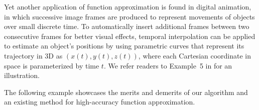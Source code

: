 \documentclass[review]{elsarticle}
\newcommand{\abstol}{\varepsilon}
\theoremstyle{definition}
\newcommand{\cosappx}{\widehat{\operatorname*{cos}}}
\newcommand{\sinappx}{\widehat{\operatorname*{sin}}}
\begin{document}
\begin{comment}
Denote $\sinappx(x)$ and $\cosappx (x)$ the approximate functions of $\sin(x)$ and
$\cos(x)$ on the interval $[0,4\pi]$, respectively; and let the resultant
approximants of $x(u,v)$, $y(u,v)$, and $z(u,v)$ be $\hat{x}(u,v)$,
$\hat{y}(u,v)$, and $\hat{z}(u,v)$, respectively.
Then we have
\begin{align*}
   \hat{x}(u,v) & =  \left[a\left(1-\frac{v}{2\pi}\right)\left(1+\cosappx(u)\right) + c\right]\cosappx(nv),
\\ \hat{y}(u,v) & = \left[a\left(1-\frac{v}{2\pi}\right)(1+\cosappx(u)) + c\right] \sinappx(nv),
\\ \hat{z}(u,v) & = \frac{bv}{2\pi} + a\left(1-\frac{v}{2\pi}\right)\sinappx(u).
\end{align*}
Define the \emph{overall} approximation error measure as the supremum norm
\begin{align*}
   \max\limits_{u,v \in [0, 2 \pi] } & \left\{   |x(u,v)-\hat{x}(u,v)|,\right.
   \left.  |y(u,v)-\hat{y}(u,v)|,
                                  \ \    |z(u,v)-\hat{z}(u,v)|\right\}.
\end{align*}
Even if we set the error tolerance $\abstol$ to be as big as $0.1$ for computing
$\sinappx$ and $\cosappx$, we can still obtain a much diminished overall error
in the order of $9 \times 10^{-4}$; see the error plot in
Figure~\ref{fig:funappxseashell}b). The reconstructed surface in
Figure~\ref{fig:funappxseashell}a) is very similar to the original seashell
image.
\end{exmp}
\end{comment}

Yet another application of function approximation is found in digital animation,
in which successive image frames are produced to represent movements of
objects over small discrete time. To automatically insert additional frames between
two consecutive frames for better visual effects, temporal
interpolation can be applied to estimate an object's positions by using
parametric curves that represent its trajectory in 3D as $(x(t), y(t), z(t))$,
where each Cartesian coordinate in space is parameterized by time $t$. We refer
readers to Example~5 in \cite[Chapter~3, Section~6]{Din15a} for an illustration.


The following example showcases the merits and demerits of our algorithm and an
existing method for high-accuracy function approximation.
\end{document}
